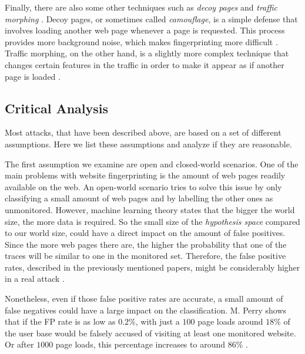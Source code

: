 Finally, there are also some other techniques such as \textit{decoy pages} and \textit{traffic morphing} \cite{wright2009traffic,panchenko1}.
Decoy pages, or sometimes called \textit{camouflage}, is a simple defense that involves loading another web page whenever a page is requested.
This process provides more background noise, which makes fingerprinting more difficult \cite{panchenko1}.
Traffic morphing, on the other hand, is a slightly more complex technique that changes certain features in the traffic in order to make it appear as if another page is loaded \cite{wright2009traffic}.

\subsection{Critical Analysis}

Most attacks, that have been described above, are based on a set of different assumptions.
Here we list these assumptions and analyze if they are reasonable.

The first assumption we examine are open and closed-world scenarios.
One of the main problems with website fingerprinting is the amount of web pages readily available on the web.
An open-world scenario tries to solve this issue by only classifying a small amount of web pages and by labelling the other ones as unmonitored.
However, machine learning theory states that the bigger the world size, the more data is required.
So the small size of the \textit{hypothesis space} compared to our world size, could have a direct impact on the amount of false positives.
Since the more web pages there are, the higher the probability that one of the traces will be similar to one in the monitored set.
Therefore, the false positive rates, described in the previously mentioned papers, might be considerably higher in a real attack \cite{wfpcritique}.

\newpage

Nonetheless, even if those false positive rates are accurate, a small amount of false negatives could have a large impact on the classification.
M. Perry shows that if the FP rate is as low as $0.2\%$, with just a $100$ page loads around $18\%$ of the user base would be falsely accused of visiting at least one monitored website.
Or after $1000$ page loads, this percentage increases to around $86\%$ \cite{wfpcritique}.

